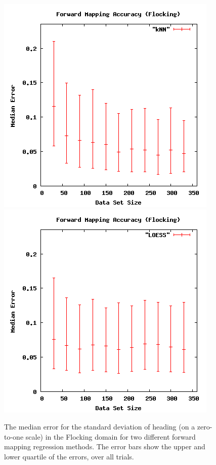 \begin{figure}[ht]
\centering
\includegraphics[scale=.4]{images/results_flocking/fmacc-kNN.png}
\includegraphics[scale=.4]{images/results_flocking/fmacc-LOESS.png}
\caption{The median error for the standard deviation of heading (on a zero-to-one scale) in the Flocking domain for two different forward mapping regression methods.
The error bars show the upper and lower quartile of the errors, over all trials.}
\label{fig:flockfmacc}
\end{figure}

